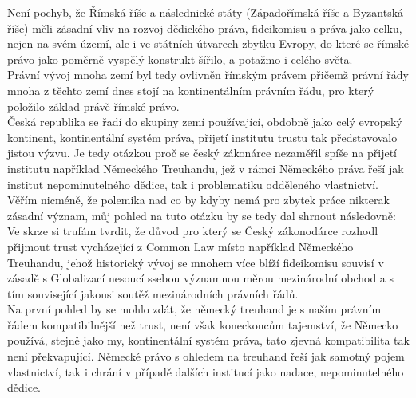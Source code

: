 \documentclass{article}
\begin{document}
Není pochyb, že Římská říše a následnické státy (Západořímská říše a Byzantská říše) měli zásadní vliv na rozvoj dědického práva, fideikomisu a práva jako celku, nejen na svém území, ale i ve státních útvarech zbytku Evropy, do které se římské právo jako poměrně vyspělý konstrukt šířilo, a potažmo i celého světa.\\

 Právní vývoj mnoha zemí byl tedy ovlivněn římským právem přičemž právní řády mnoha z těchto zemí dnes stojí na kontinentálním právním řádu, pro který položilo základ právě římské právo.\\

 Česká republika se řadí do skupiny zemí používající, obdobně jako celý evropský kontinent, kontinentální systém práva, přijetí institutu trustu tak představovalo jistou výzvu. Je tedy otázkou proč se český zákonárce nezaměřil spíše na přijetí institutu například Německého Treuhandu, jež v rámci Německého práva řeší jak institut nepominutelného dědice, tak i problematiku odděleného vlastnictví. Věřím nicméně, že polemika nad co by kdyby nemá pro zbytek práce nikterak zásadní význam, můj pohled na tuto otázku by se tedy dal shrnout následovně: Ve skrze si trufám tvrdit, že důvod pro který se Český zákonodárce rozhodl přijmout trust vycházející z Common Law místo například Německého Treuhandu, jehož historický vývoj se mnohem více blíží fideikomisu souvisí v zásadě s Globalizací nesoucí ssebou významnou měrou mezinárodní obchod a s tím související jakousi soutěž mezinárodních právních řádů.\\
 
 Na první pohled by se mohlo zdát, že německý treuhand je s naším právním řádem kompatibilnější než trust, není však koneckoncům tajemství, že Německo používá, stejně jako my, kontinentální systém práva, tato zjevná kompatibilita tak není překvapující. Německé právo s ohledem na treuhand řeší jak samotný pojem vlastnictví, tak i chrání v případě dalších institucí jako nadace, nepominutelného dědice.\\
 
\end{document}
